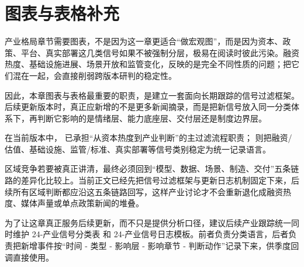 \chapter*{图表与表格补充}

产业格局章节需要图表，不是因为这一章更适合“做宏观图”，而是因为资本、政策、平台、真实部署这几类信号如果不被强制分层，极易在阅读时彼此污染。融资热度、基础设施进展、场景开放和监管变化，反映的是完全不同性质的问题；把它们混在一起，会直接削弱跨版本研判的稳定性。

因此，本章图表与表格最重要的职责，是建立一套面向长期跟踪的信号过滤框架。后续更新版本时，真正应新增的不是更多新闻摘录，而是把新信号放入同一分类体系下，再判断它影响的是情绪层、能力底座层、交付层还是制度边界层。

在当前版本中，\texttt{} 已承担“从资本热度到产业判断”的主过滤流程职责；\texttt{} 则把融资/估值、基础设施、监管/标准、真实部署等信号类别稳定为统一记录语言。

区域竞争若要被真正讲清，最终必须回到“模型、数据、场景、制造、交付”五条链路的差异化比较上。当前正文已经先把信号过滤框架与更新日志机制固定下来，后续所有区域判断都应沿这五条链路回写，这样产业讨论才不会重新退化成融资热度、媒体声量或单点政策新闻的堆叠。

为了让这章真正服务后续更新，而不只是提供分析口径，建议后续产业跟踪统一同时维护 24-产业信号分类表 和 24-产业信号日志模板。前者负责分类语言，后者负责把新增事件按“时间 - 类型 - 影响层 - 影响章节 - 判断动作”记录下来，供季度回调直接使用。
